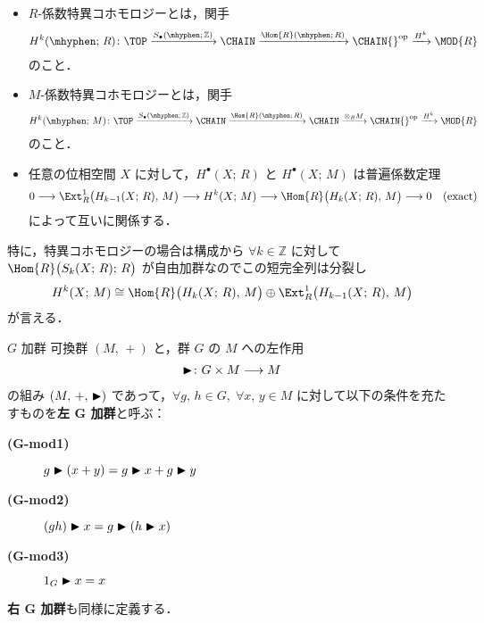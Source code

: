 \documentclass[TQFT_main]{subfiles}
\begin{document}
\begin{itemize}
    \item 
    $R$-係数特異コホモロジーとは，関手
    \begin{align}
        H^k (\mhyphen ;\, R)\colon \TOP \xrightarrow{S_{\bullet}(\mhyphen ;\, \mathbb{Z})} \CHAIN \xrightarrow{\Hom{R} (\mhyphen;\, R)} \CHAIN{}^{\mathrm{op}} \xrightarrow{H^k} \MOD{R}
    \end{align}
    のこと．
    \item 
    $M$-係数特異コホモロジーとは，関手
    \begin{align}
        H^k (\mhyphen ;\, M)\colon \TOP \xrightarrow{S_{\bullet}(\mhyphen ;\, \mathbb{Z})} \CHAIN \xrightarrow{\Hom{R} (\mhyphen;\, R)} \CHAIN \xrightarrow{\otimes_R M} \CHAIN{}^{\mathrm{op}} \xrightarrow{H^k} \MOD{R}
    \end{align}
    のこと．
    \item 
    任意の位相空間 $X$ に対して，$H^\bullet (X;\, R)$ と $H^\bullet (X;\, M)$ は普遍係数定理
    \begin{align}
        \label{eq:univ-coeff-co}
        0 \lto \Ext^1_R \bigl(H_{k-1}(X;\, R),\, M\bigr) \lto H^k(X;\, M) \lto \Hom{R} \bigl( H_{k}(X;\, R),\, M \bigr) \lto 0 \quad (\text{exact})
    \end{align}
    によって互いに関係する．
\end{itemize}
特に，特異コホモロジーの場合は構成から $\forall k \in \mathbb{Z}$ に対して $\Hom{R} \bigl(S_k(X;\, R);\, R\bigr)$ が自由加群なのでこの短完全列は分裂し
\begin{align}
    H^k (X;\, M) \cong \Hom{R} \bigl( H_k(X;\, R),\, M\bigr) \oplus \Ext^1_R \bigl( H_{k-1}(X;\, R),\, M \bigr)
\end{align}
が言える．

\begin{myaxiom}[label=ax:G-mod]{$G$ 加群}
    可換群 $(M,\, +)$ と，群 $G$ の $M$ への左作用
    \begin{align}
        \blacktriangleright \colon G \times M \longrightarrow M
    \end{align}
    の組み $(M,\, +,\, \blacktriangleright)$ であって，$\forall g,\, h \in G,\; \forall x,\, y \in M$ に対して以下の条件を充たすものを\textbf{左 $\bm{G}$ 加群}と呼ぶ：
    \begin{description}
        \item[\textbf{(G-mod1)}] $g \blacktriangleright (x+y) = g\blacktriangleright x + g\blacktriangleright y$
        \item[\textbf{(G-mod2)}] $(gh) \blacktriangleright x = g \blacktriangleright (h \blacktriangleright x)$
        \item[\textbf{(G-mod3)}] $1_G \blacktriangleright x = x$ 
    \end{description}
    \tcblower
    \textbf{右 $\bm{G}$ 加群}も同様に定義する．
\end{myaxiom}
\end{document}
